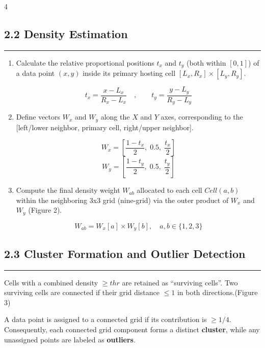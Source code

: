\documentclass[
	landscape, %
]{ImperialPoster}
\begin{document}
\begin{multicols}{4}
	\columnbreak
	\subsection{2.2 Density Estimation}
    \vspace{-0.8cm} 
	\rule{\linewidth}{3pt} 
	\begin{enumerate}
		\item Calculate the relative proportional positions $t_x$ and $t_y$ (both within $[0,1]$) of a data point $(x,y)$ inside its primary hosting cell $[L_x, R_x] \times [L_y, R_y]$.
		
		\[
		t_x=\frac{x-L_x}{R_x-L_x}\quad,
		\qquad
		t_y=\frac{y-L_y}{R_y-L_y}
		\]
		
		\item Define vectors $W_x$ and $W_y$ along the $X$ and $Y$ axes, corresponding to the [left/lower neighbor, primary cell, right/upper neighbor].
		
    \[
    W_x = \left[ \frac{1 - t_x}{2},\; 0.5,\; \frac{t_x}{2} \right]
    \]
    \[
    W_y = \left[ \frac{1 - t_y}{2},\; 0.5,\; \frac{t_y}{2} \right]
    \]
		
		\item Compute the final density weight $W_{ab}$ allocated to each cell $Cell(a, b)$ within the neighboring 3x3 grid (nine-grid) via the outer product of $W_x$ and $W_y$ (Figure 2).
		
		\[
		W_{ab} = W_x[a] \times W_y[b], \quad a,b \in \{1,2,3\}
		\]
	\end{enumerate}


	\subsection{2.3 Cluster Formation and Outlier Detection}
    \vspace{-0.8cm} 
	\rule{\linewidth}{3pt}
Cells with a combined density $\geq thr$ are retained as ``surviving cells''. Two surviving cells are connected if their grid distance $\leq 1$ in both directions.(Figure 3) 

A data point is assigned to a connected grid if its contribution is $\geq 1/4$. Consequently, each connected grid component forms a distinct \textbf{cluster}, while any unassigned points are labeled as \textbf{outliers}.
	
	\columnbreak
    

\end{multicols}
\end{document}
